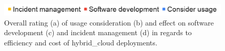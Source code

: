 \documentclass[../main.tex]{subfiles}
\begin{document}
    \begin{figure}[h]
        \includegraphics[width=.7\linewidth]{img/res-assess-label.png}
        \centering
        \hfill
        \captionsetup{justification=centering}
        \caption{
            Overall rating (a) of usage consideration (b) and effect on software development (c) and incident management (d) in regards to efficiency and cost of \gls{hybrid_cloud} deployments.
        }
        \label{fig:res_asses_policy}
    \end{figure}
\end{document}

